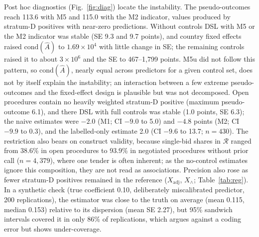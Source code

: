 \documentclass[runningheads]{llncs}
\begin{document}
Post hoc diagnostics (Fig.~\ref{fig:diag}) locate the instability. The pseudo-outcomes reach 113.6 with M5 and 115.0 with the M2 indicator, values produced by stratum-D positives with near-zero predictions. Without controls DSL with M5 or the M2 indicator was stable (SE 9.3 and 9.7 points), and country fixed effects raised $\mathrm{cond}(\hat{A})$ to $1.69\times10^4$ with little change in SE; the remaining controls raised it to about $3\times10^6$ and the SE to 467--1,799 points. M5u did not follow this pattern, so $\mathrm{cond}(\hat{A})$, nearly equal across predictors for a given control set, does not by itself explain the instability; an interaction between a few extreme pseudo-outcomes and the fixed-effect design is plausible but was not decomposed. Open procedures contain no heavily weighted stratum-D positive (maximum pseudo-outcome 6.1), and there DSL with full controls was stable (1.0 points, SE 6.3); the naive estimates were $-2.0$ (M1; CI $-9.0$ to 5.0) and $-4.8$ points (M2; CI $-9.9$ to 0.3), and the labelled-only estimate 2.0 (CI $-9.6$ to 13.7; $n=430$). The restriction also bears on construct validity, because single-bid shares in $\mathcal{R}$ ranged from 38.6\% in open procedures to 93.9\% in negotiated procedures without prior call ($n=4{,}379$), where one tender is often inherent; as the no-control estimates ignore this composition, they are not read as associations. Precision also rose as fewer stratum-D positives remained in the reference ($X_{\mathrm{adj}}$, $X_\wedge$; Table~\ref{tab:reg}). In a synthetic check (true coefficient 0.10, deliberately miscalibrated predictor, 200 replications), the estimator was close to the truth on average (mean 0.115, median 0.153) relative to its dispersion (mean SE 2.27), but 95\% sandwich intervals covered it in only 86\% of replications, which argues against a coding error but shows under-coverage.
\end{document}
